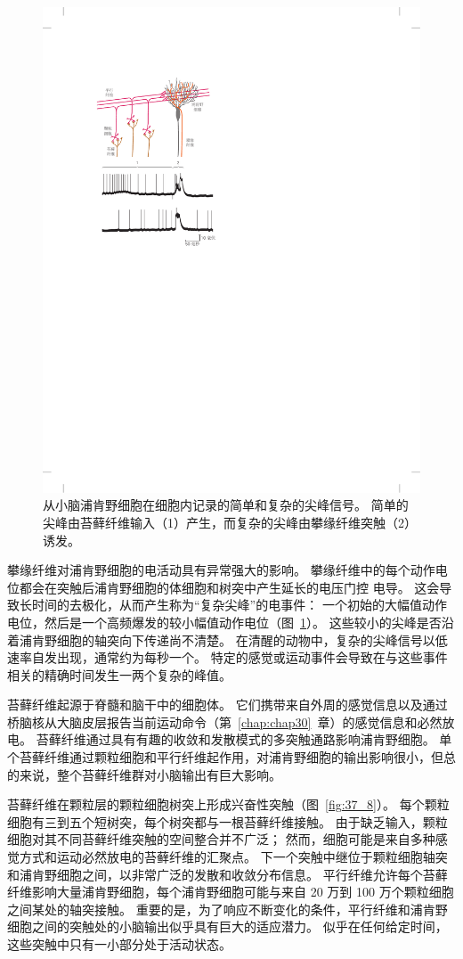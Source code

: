 \begin{figure}[htbp]
	\centering
	\includegraphics[width=0.5\linewidth]{chap37/fig_37_9}
	\caption{从小脑浦肯野细胞在细胞内记录的简单和复杂的尖峰信号。
		简单的尖峰由苔藓纤维输入（1）产生，而复杂的尖峰由攀缘纤维突触（2）诱发\cite{martinez1971electrogenesis}。}
	\label{fig:37_9}
\end{figure}


攀缘纤维对浦肯野细胞的电活动具有异常强大的影响。
攀缘纤维中的每个动作电位都会在突触后浦肯野细胞的体细胞和树突中产生延长的电压门控  电导。
这会导致长时间的去极化，从而产生称为“复杂尖峰”的电事件：
一个初始的大幅值动作电位，然后是一个高频爆发的较小幅值动作电位（图~\ref{fig:37_9}）。
这些较小的尖峰是否沿着浦肯野细胞的轴突向下传递尚不清楚。
在清醒的动物中，复杂的尖峰信号以低速率自发出现，通常约为每秒一个。
特定的感觉或运动事件会导致在与这些事件相关的精确时间发生一两个复杂的峰值。


苔藓纤维起源于脊髓和脑干中的细胞体。
它们携带来自外周的感觉信息以及通过桥脑核从大脑皮层报告当前运动命令（第~\ref{chap:chap30}~章）的感觉信息和必然放电。
苔藓纤维通过具有有趣的收敛和发散模式的多突触通路影响浦肯野细胞。
单个苔藓纤维通过颗粒细胞和平行纤维起作用，对浦肯野细胞的输出影响很小，但总的来说，整个苔藓纤维群对小脑输出有巨大影响。


苔藓纤维在颗粒层的颗粒细胞树突上形成兴奋性突触（图~\ref{fig:37_8}）。
每个颗粒细胞有三到五个短树突，每个树突都与一根苔藓纤维接触。
由于缺乏输入，颗粒细胞对其不同苔藓纤维突触的空间整合并不广泛；
然而，细胞可能是来自多种感觉方式和运动必然放电的苔藓纤维的汇聚点。
下一个突触中继位于颗粒细胞轴突和浦肯野细胞之间，以非常广泛的发散和收敛分布信息。
平行纤维允许每个苔藓纤维影响大量浦肯野细胞，每个浦肯野细胞可能与来自 20 万到 100 万个颗粒细胞之间某处的轴突接触。
重要的是，为了响应不断变化的条件，平行纤维和浦肯野细胞之间的突触处的小脑输出似乎具有巨大的适应潜力。
似乎在任何给定时间，这些突触中只有一小部分处于活动状态。


